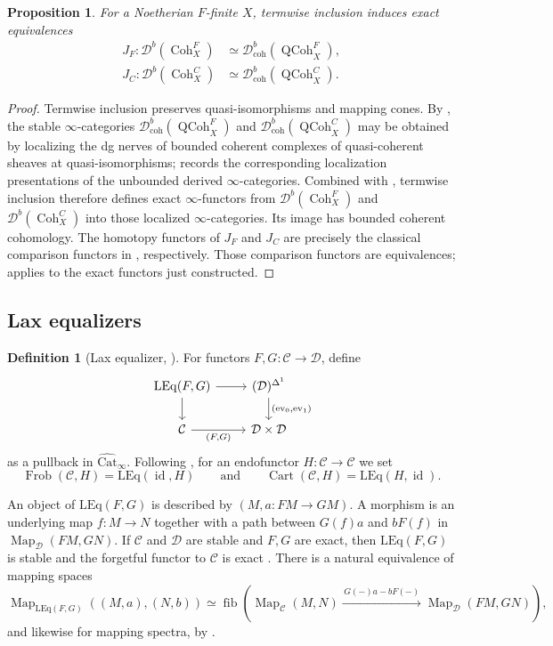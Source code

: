 \documentclass[11pt]{amsart}
\newcommand{\cC}{\mathcal{C}}
\newcommand{\cD}{\mathcal{D}}
\newcommand{\Cart}{\operatorname{Cart}}
\newcommand{\id}{\operatorname{id}}
\newcommand{\Map}{\operatorname{Map}}
\newcommand{\QCoh}{\operatorname{{QCoh}}}
\newcommand{\Coh}{\operatorname{{Coh}}}
\newcommand{\LEq}{\mathrm{LEq}}
\newcommand{\ev}{\mathrm{ev}}
\newcommand{\Catbig}{\widehat{\mathrm{Cat}}}
\newcommand{\Frob}{\operatorname{Frob}}
\newcommand{\fib}{\operatorname{fib}}
\newcommand{\Db}{\mathcal D^b}
\theoremstyle{plain}
\newtheorem{proposition}[proposition]{Proposition}
\theoremstyle{definition}
\newtheorem{definition}[definition]{Definition}
\numberwithin{equation}{section}
\begin{document}
\begin{proposition}\label{prop:realization}
For a Noetherian $F$-finite $X$, termwise inclusion induces exact equivalences
\begin{align*}
 J_F:\Db(\Coh^F_X)&\simeq\mathcal D^b_{\mathrm{coh}}(\QCoh^F_X),\\
 J_C:\Db(\Coh^C_X)&\simeq\mathcal D^b_{\mathrm{coh}}(\QCoh^C_X).
\end{align*}
\end{proposition}
\begin{proof}
Termwise inclusion preserves quasi-isomorphisms and mapping cones.
By \cite[Proposition 1.3.5.13]{HA}, the stable $\infty$-categories $\mathcal D^b_{\mathrm{coh}}(\QCoh^F_X)$ and $\mathcal D^b_{\mathrm{coh}}(\QCoh^C_X)$ may be obtained by localizing the dg nerves of bounded coherent complexes of quasi-coherent sheaves at quasi-isomorphisms; \cite[Proposition 1.3.5.15]{HA} records the corresponding localization presentations of the unbounded derived $\infty$-categories.
Combined with , termwise inclusion therefore defines exact $\infty$-functors from $\Db(\Coh^F_X)$ and $\Db(\Coh^C_X)$ into those localized $\infty$-categories.
Its image has bounded coherent cohomology.
The homotopy functors of $J_F$ and $J_C$ are precisely the classical comparison functors in \cite[Proposition 2.2.15; Corollary 3.2.24]{Bau}, respectively.
Those comparison functors are equivalences;  applies to the exact functors just constructed.
\end{proof}

\subsection{Lax equalizers}
\begin{definition}[{Lax equalizer, \cite[Definition II.1.4]{NS}}]\label{def:leq}
For functors $F,G:\cC\to\cD$, define
\[
\begin{tikzcd}
 \LEq(F,G)\ar[r]\ar[d] & (\cD)^{\Delta^1}\ar[d,"{(\ev_0,\ev_1)}"]\\
 \cC\ar[r,"{(F,G)}"']&\cD\times\cD
\end{tikzcd}
\]
as a pullback in $\Catbig_\infty$.
Following \cite[Definition 2.4]{MWC}, for an endofunctor $H:\cC\to\cC$ we set
\[
 \Frob(\cC,H)=\LEq(\id,H)
 \qquad\text{and}\qquad
 \Cart(\cC,H)=\LEq(H,\id).
\]
\end{definition}
An object of $\LEq(F,G)$ is described by $(M,a:FM\to GM)$.
A morphism is an underlying map $f:M\to N$ together with a path between $G(f)a$ and $bF(f)$ in $\Map_{\cD}(FM,GN)$.
If $\cC$ and $\cD$ are stable and $F,G$ are exact, then $\LEq(F,G)$ is stable and the forgetful functor to $\cC$ is exact \cite[Proposition 2.6(e)]{MWC}.
There is a natural equivalence of mapping spaces
\begin{equation}\label{eq:map-fiber}
 \Map_{\LEq(F,G)}((M,a),(N,b))\simeq
 \fib\left(\Map_{\cC}(M,N)
 \xrightarrow{\,G(-)a-bF(-)\,}\Map_{\cD}(FM,GN)\right),
\end{equation}
and likewise for mapping spectra, by \cite[Proposition 2.6(a)]{MWC}.
\end{document}
